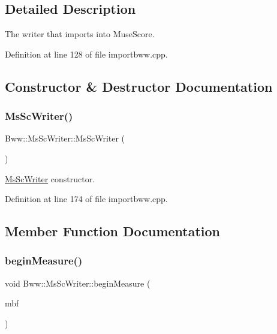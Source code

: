 \subsection{Detailed Description}
The writer that imports into Muse\+Score. 

Definition at line 128 of file importbww.\+cpp.



\subsection{Constructor \& Destructor Documentation}
\mbox{\label{class_bww_1_1_ms_sc_writer_aebc249aecf32347d49866fdc06edaa6e}} 
\subsubsection{\texorpdfstring{Ms\+Sc\+Writer()}{MsScWriter()}}
{\footnotesize\ttfamily Bww\+::\+Ms\+Sc\+Writer\+::\+Ms\+Sc\+Writer (\begin{DoxyParamCaption}{ }\end{DoxyParamCaption})}

\hyperlink{class_bww_1_1_ms_sc_writer}{Ms\+Sc\+Writer} constructor. 

Definition at line 174 of file importbww.\+cpp.



\subsection{Member Function Documentation}
\mbox{\label{class_bww_1_1_ms_sc_writer_a95b57a18e804232fd724ce054dfd9d9d}} 
\subsubsection{\texorpdfstring{begin\+Measure()}{beginMeasure()}}
{\footnotesize\ttfamily void Bww\+::\+Ms\+Sc\+Writer\+::begin\+Measure (\begin{DoxyParamCaption}\item[{const \hyperlink{struct_bww_1_1_measure_begin_flags}{Bww\+::\+Measure\+Begin\+Flags}}]{mbf }\end{DoxyParamCaption})\hspace{0.3cm}{\ttfamily [virtual]}}

